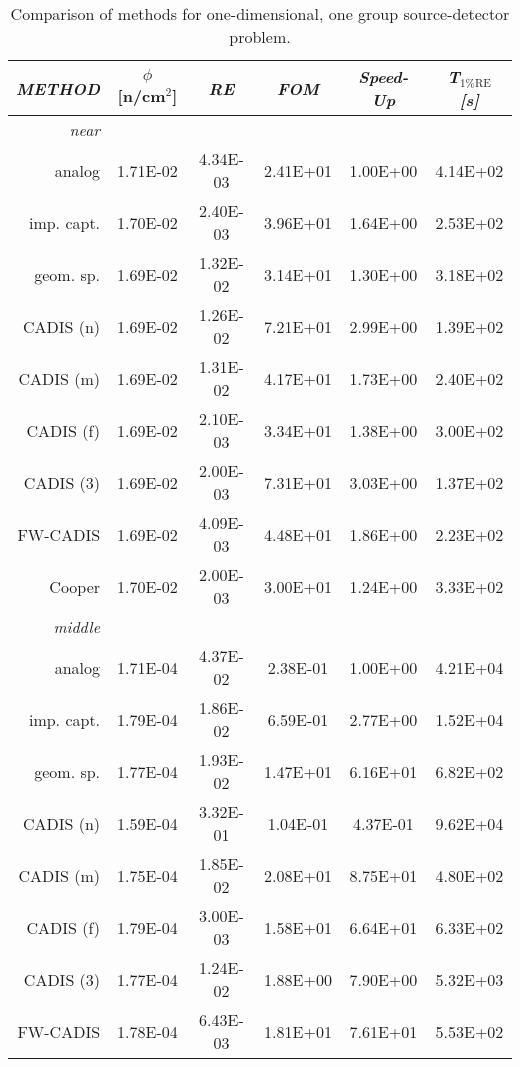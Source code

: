 \begin{table*}[!]
 \caption{Comparison of methods for one-dimensional, one group source-detector
problem.}
 \begin{center} 
 \small{
 \begin{tabular*}{0.90\textwidth}{@{\extracolsep{\fill}} rccccc } 
  \toprule 
   \emph{ METHOD}  &  $\phi$ [n/cm$^2$]  &  \emph{ RE} & \emph{ FOM} &  \emph{ Speed-Up}
& \emph{ T$_{\mathrm{1\% RE}}$ [s]} \\
  \midrule 
   \emph{ near}   &  & & & &  \\
  \midrule
   analog      & 1.71E-02 & 4.34E-03 & 2.41E+01 & 1.00E+00 & 4.14E+02 \\
   imp. capt.  & 1.70E-02 & 2.40E-03 & 3.96E+01 & 1.64E+00 & 2.53E+02 \\
   geom. sp.   & 1.69E-02 & 1.32E-02 & 3.14E+01 & 1.30E+00 & 3.18E+02 \\
   CADIS (n)   & 1.69E-02 & 1.26E-02 & 7.21E+01 & 2.99E+00 & 1.39E+02 \\
   CADIS (m)   & 1.69E-02 & 1.31E-02 & 4.17E+01 & 1.73E+00 & 2.40E+02 \\
   CADIS (f)   & 1.69E-02 & 2.10E-03 & 3.34E+01 & 1.38E+00 & 3.00E+02 \\
   CADIS (3)   & 1.69E-02 & 2.00E-03 & 7.31E+01 & 3.03E+00 & 1.37E+02 \\
   FW-CADIS    & 1.69E-02 & 4.09E-03 & 4.48E+01 & 1.86E+00 & 2.23E+02 \\
   Cooper      & 1.70E-02 & 2.00E-03 & 3.00E+01 & 1.24E+00 & 3.33E+02 \\
  \midrule 
   \emph{ middle}   &  & & & & \\
  \midrule
   analog      & 1.71E-04 & 4.37E-02 & 2.38E-01 & 1.00E+00 & 4.21E+04 \\
   imp. capt.  & 1.79E-04 & 1.86E-02 & 6.59E-01 & 2.77E+00 & 1.52E+04 \\
   geom. sp.   & 1.77E-04 & 1.93E-02 & 1.47E+01 & 6.16E+01 & 6.82E+02 \\
   CADIS (n)   & 1.59E-04 & 3.32E-01 & 1.04E-01 & 4.37E-01 & 9.62E+04 \\
   CADIS (m)   & 1.75E-04 & 1.85E-02 & 2.08E+01 & 8.75E+01 & 4.80E+02 \\
   CADIS (f)   & 1.79E-04 & 3.00E-03 & 1.58E+01 & 6.64E+01 & 6.33E+02 \\
   CADIS (3)   & 1.77E-04 & 1.24E-02 & 1.88E+00 & 7.90E+00 & 5.32E+03 \\
   FW-CADIS    & 1.78E-04 & 6.43E-03 & 1.81E+01 & 7.61E+01 & 5.53E+02 \\

\end{tabular*}}
\end{center}
\end{table*}
